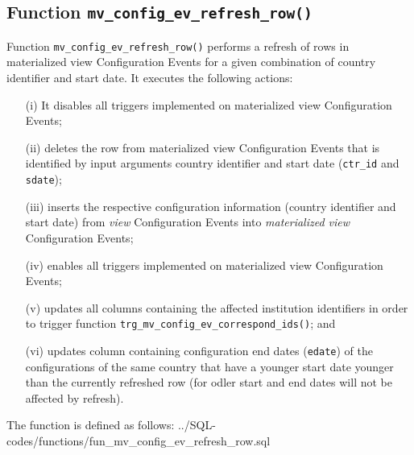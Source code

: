 \subsection{Function \texttt{mv\_config\_ev\_refresh\_row()}}\label{subsec_fun_mv_config_ev_refresh_row}

Function \texttt{mv\_config\_ev\_refresh\_row()} performs a refresh of rows in materialized view Configuration Events for a given combination of country identifier and start date.
It executes the following actions:
\begin{itemize}
\item[(i)]{It disables all triggers implemented on materialized view Configuration Events;}
\item[(ii)]{deletes the row from materialized view Configuration Events that is identified by input arguments country identifier and start date (\texttt{ctr\_id} and \texttt{sdate});}
\item[(iii)]{inserts the respective configuration information (country identifier and start date) from {\em view} Configuration Events into {\em materialized view} Configuration Events;}
\item[(iv)]{enables all triggers implemented on materialized view Configuration Events;}
\item[(v)]{updates all columns containing the affected institution identifiers in order to trigger function \texttt{trg\_mv\_config\_ev\_correspond\_ids()}; and}
\item[(vi)]{updates column containing configuration end dates (\texttt{edate}) of the configurations of the same country that have a younger start date younger than the currently refreshed row (for odler start and end dates will not be affected by refresh).}
\end{itemize}

The function is defined as follows:
%
{../SQL-codes/functions/fun_mv_config_ev_refresh_row.sql}
